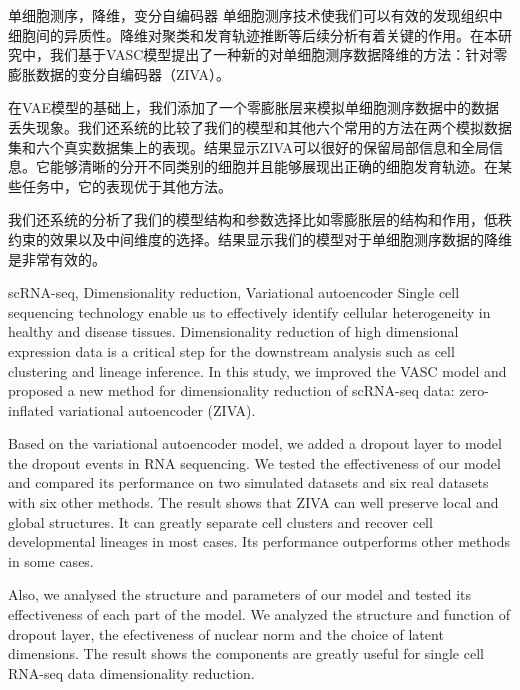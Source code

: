 \begin{中文摘要}{单细胞测序，降维，变分自编码器}
  单细胞测序技术使我们可以有效的发现组织中细胞间的异质性。降维对聚类和发育轨迹推断等后续分析有着关键的作用。在本研究中，我们基于VASC模型提出了一种新的对单细胞测序数据降维的方法：针对零膨胀数据的变分自编码器（ZIVA）。
  
  在VAE模型的基础上，我们添加了一个零膨胀层来模拟单细胞测序数据中的数据丢失现象。我们还系统的比较了我们的模型和其他六个常用的方法在两个模拟数据集和六个真实数据集上的表现。结果显示ZIVA可以很好的保留局部信息和全局信息。它能够清晰的分开不同类别的细胞并且能够展现出正确的细胞发育轨迹。在某些任务中，它的表现优于其他方法。
  
  我们还系统的分析了我们的模型结构和参数选择比如零膨胀层的结构和作用，低秩约束的效果以及中间维度的选择。结果显示我们的模型对于单细胞测序数据的降维是非常有效的。
\end{中文摘要}

\begin{英文摘要}{scRNA-seq, Dimensionality reduction, Variational autoencoder}
  Single cell sequencing technology enable us to effectively identify cellular heterogeneity in healthy and disease tissues. Dimensionality reduction of high dimensional expression data is a critical step for the downstream analysis such as cell clustering and lineage inference. In this study, we improved the VASC model and proposed a new method for dimensionality reduction of scRNA-seq data: zero-inflated variational autoencoder (ZIVA).
  
  Based on the variational autoencoder model, we added a dropout layer to model the dropout events in RNA sequencing. We tested the effectiveness of our model and compared its performance on two simulated datasets and six real datasets with six other methods. The result shows that ZIVA can well preserve local and global structures. It can greatly separate cell clusters and recover cell developmental lineages in most cases. Its performance outperforms other methods in some cases. 
  
  Also, we analysed the structure and parameters of our model and tested its effectiveness of each part of the model. We analyzed the structure and function of dropout layer, the efectiveness of nuclear norm and the choice of latent dimensions. The result shows the components are greatly useful for single cell RNA-seq data dimensionality reduction.
\end{英文摘要}
